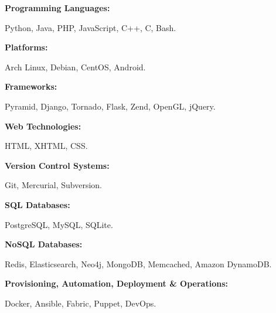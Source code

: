 \documentclass[10pt]{article}
\newenvironment{innerlist}[1][\enskip\textbullet]%
        {\begin{compactitem}[#1]}{\end{compactitem}}
\begin{document}
\textbf{Programming Languages:}
\begin{innerlist}
\item[]
Python, Java, PHP, JavaScript, C++, C, Bash.
\end{innerlist}
\vspace{0.1in}

\textbf{Platforms:}
\begin{innerlist}
\item[]
Arch Linux, Debian, CentOS, Android.
\end{innerlist}
\vspace{0.1in}

\textbf{Frameworks:}
\begin{innerlist}
\item[]
Pyramid, Django, Tornado, Flask, Zend, OpenGL, jQuery.
\end{innerlist}
\vspace{0.1in}

\textbf{Web Technologies:}
\begin{innerlist}
\item[] HTML, XHTML, CSS.
\end{innerlist}
\vspace{0.1in}

\textbf{Version Control Systems:}
\begin{innerlist}
\item[] Git, Mercurial, Subversion.
\end{innerlist}
\vspace{0.1in}

\textbf{SQL Databases:}
\begin{innerlist}
\item[]PostgreSQL, MySQL, SQLite.
\end{innerlist}
\vspace{0.1in}

\textbf{NoSQL Databases:}
\begin{innerlist}
\item[] Redis, Elasticsearch, Neo4j, MongoDB, Memcached, Amazon DynamoDB.
\end{innerlist}
\vspace{0.1in}

\textbf{Provisioning, Automation, Deployment \& Operations:}
\begin{innerlist}
\item[] Docker, Ansible, Fabric, Puppet, DevOps.
\end{innerlist}
\vspace{0.1in}
\end{document}
